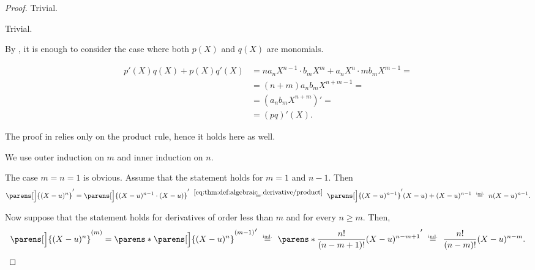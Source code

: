 \begin{proof}
   Trivial.

   Trivial.

   By , it is enough to consider the case where both \( p(X) \) and \( q(X) \) are monomials.

  \begin{align*}
    p'(X) q(X) + p(X) q'(X)
    &=
    n a_n X^{n-1} \cdot b_m X^m + a_n X^n \cdot m b_m X^{m-1}
    = \\ &=
    (n + m) a_n b_m X^{n+m-1}
    = \\ &=
    (a_n b_m X^{n+m})'
    = \\ &=
    (pq)'(X).
  \end{align*}

   The proof in  relies only on the product rule, hence it holds here as well.

   We use outer induction on \( m \) and inner induction on \( n \).

  The case \( m = n = 1 \) is obvious. Assume that the statement holds for \( m = 1 \) and \( n - 1 \). Then
  \begin{equation*}
    \parens[\Big]{ (X - u)^n }'
    =
    \parens[\Big]{ (X - u)^{n-1} \cdot (X - u) }'
    \reloset {\eqref{eq:thm:def:algebraic_derivative/product}} =
    \parens[\Big]{ (X - u)^{n-1} }' (X - u) + (X - u)^{n-1}
    \reloset {\T{ind.}} =
    n (X - u)^{n-1}.
  \end{equation*}

  Now suppose that the statement holds for derivatives of order less than \( m \) and for every \( n \geq m \). Then,
  \begin{equation*}
    \parens[\Big]{ (X - u)^n }^{(m)}
    =
    \parens*{\parens[\Big]{ (X - u)^n }^{(m-1)}}'
    \reloset {\T{ind.}} =
    \parens*{ \frac {n!} {(n - m + 1)!} (X - u)^{n - m + 1} }'
    \reloset {\T{ind.}} =
    \frac {n!} {(n - m)!} (X - u)^{n - m}.
  \end{equation*}
\end{proof}

